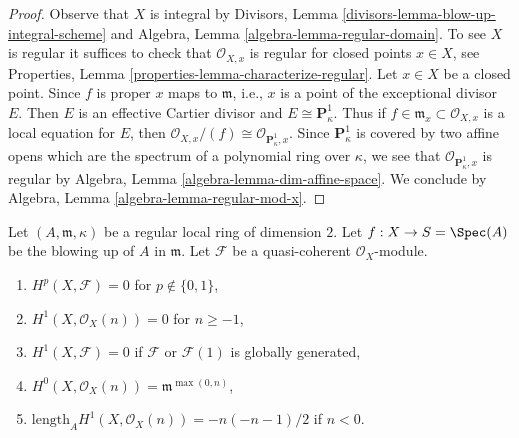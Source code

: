 \begin{proof}
Observe that $X$ is integral by
Divisors, Lemma \ref{divisors-lemma-blow-up-integral-scheme}
and
Algebra, Lemma \ref{algebra-lemma-regular-domain}.
To see $X$ is regular it suffices to check that $\mathcal{O}_{X, x}$
is regular for closed points $x \in X$, see
Properties, Lemma \ref{properties-lemma-characterize-regular}.
Let $x \in X$ be a closed point. Since $f$ is proper $x$ maps to
$\mathfrak m$, i.e., $x$ is a point of the exceptional divisor $E$.
Then $E$ is an effective Cartier divisor and $E \cong \mathbf{P}^1_\kappa$.
Thus if $f \in \mathfrak m_x \subset \mathcal{O}_{X, x}$ is a local
equation for $E$, then
$\mathcal{O}_{X, x}/(f) \cong \mathcal{O}_{\mathbf{P}^1_\kappa, x}$.
Since $\mathbf{P}^1_\kappa$ is covered by two affine opens which are the
spectrum of a polynomial ring over $\kappa$, we see that
$\mathcal{O}_{\mathbf{P}^1_\kappa, x}$ is regular by
Algebra, Lemma \ref{algebra-lemma-dim-affine-space}.
We conclude by
Algebra, Lemma \ref{algebra-lemma-regular-mod-x}.
\end{proof}

\begin{lemma}
\label{lemma-cohomology-of-blowup}
Let $(A, \mathfrak m, \kappa)$ be a regular local ring of dimension $2$.
Let $f : X \to S = \Spec(A)$ be the blowing up of $A$ in $\mathfrak m$.
Let $\mathcal{F}$ be a quasi-coherent $\mathcal{O}_X$-module.
\begin{enumerate}
\item $H^p(X, \mathcal{F}) = 0$ for $p \not \in \{0, 1\}$,
\item $H^1(X, \mathcal{O}_X(n)) = 0$ for $n \geq -1$,
\item $H^1(X, \mathcal{F}) = 0$ if $\mathcal{F}$ or $\mathcal{F}(1)$
is globally generated,
\item $H^0(X, \mathcal{O}_X(n)) = \mathfrak m^{\max(0, n)}$,
\item $\text{length}_A H^1(X, \mathcal{O}_X(n)) = -n(-n - 1)/2$
if $n < 0$.
\end{enumerate}
\end{lemma}

